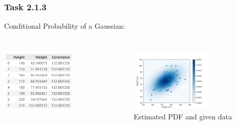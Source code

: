 \documentclass[10pt,aspectratio=169,handout]{beamer}
\begin{document}
\begin{frame}
    \frametitle{Task 2.1.3}
    Conditional Probability of a Gaussian:
    \inputminted[bgcolor=LightGray,fontsize=\small]{python}{code/predict-gaussian.py}
    
    \begin{columns}
        \begin{column}{0.5\textwidth}
        \begin{center}
            \includegraphics[width=0.7\textwidth]{images/predictions.png}
        \end{center}
        \end{column}
        \begin{column}{0.5\textwidth}  
        \begin{figure}
            \centering
            \includegraphics[width=0.7\textwidth]{images/gaussian.png}
            \caption{Estimated PDF and given data}
            \end{figure}
        \end{column}
    \end{columns}
\end{frame}
\end{document}
